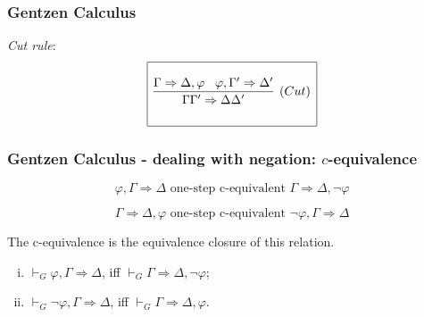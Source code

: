 \documentclass[10pt]{beamer}
\begin{document}
\begin{frame}
\frametitle{Gentzen Calculus}

\emph{{\color{blue}Cut rule}}:
 \[\begin{array}{|c|}
\hline
\\
\infer[(Cut)]{\Gamma\Gamma'\Rightarrow\Delta\Delta'}{\Gamma\Rightarrow\Delta,\varphi\;\;\;\varphi,\Gamma'\Rightarrow\Delta'}\\[5mm]
\hline
\end{array} 
\]

\end{frame}

\begin{frame}
\frametitle{Gentzen Calculus - dealing with negation: $c$-equivalence}

\[\varphi,\Gamma\Rightarrow\Delta \mbox{ one-step c-equivalent }
\Gamma\Rightarrow\Delta,\neg\varphi\]

\[\Gamma\Rightarrow\Delta, \varphi \mbox{ one-step c-equivalent }
\neg\varphi,\Gamma\Rightarrow\Delta\]

The {\color{blue}c-equivalence}  is the equivalence closure of this relation.

\begin{lemma}
\begin{enumerate}[(i)]
\item $\vdash_G\varphi, \Gamma\Rightarrow\Delta$, iff 
$\vdash_G\Gamma\Rightarrow\Delta, \neg\varphi$;
\item $\vdash_G\neg\varphi, \Gamma\Rightarrow\Delta$, iff
 $\vdash_G\Gamma\Rightarrow\Delta, \varphi$.
\end{enumerate}
\end{lemma}
\end{frame}

\end{document}
